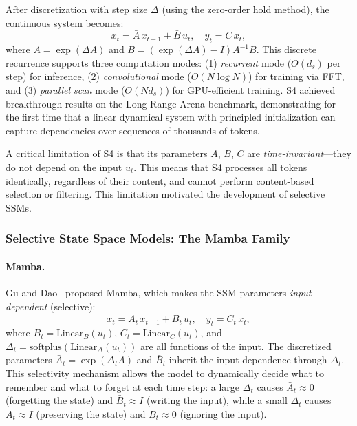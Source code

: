 After discretization with step size $\Delta$ (using the zero-order hold method), the continuous system becomes:
\begin{equation}
x_t = \bar{A}\, x_{t-1} + \bar{B}\, u_t, \quad y_t = C\, x_t,
\label{eq:ssm-discrete}
\end{equation}
where $\bar{A} = \exp(\Delta A)$ and $\bar{B} = (\exp(\Delta A) - I) A^{-1} B$. This discrete recurrence supports three computation modes: (1) \emph{recurrent} mode ($O(d_s)$ per step) for inference, (2) \emph{convolutional} mode ($O(N \log N)$) for training via FFT, and (3) \emph{parallel scan} mode ($O(N d_s)$) for GPU-efficient training. S4 achieved breakthrough results on the Long Range Arena benchmark, demonstrating for the first time that a linear dynamical system with principled initialization can capture dependencies over sequences of thousands of tokens.

A critical limitation of S4 is that its parameters $A$, $B$, $C$ are \emph{time-invariant}---they do not depend on the input $u_t$. This means that S4 processes all tokens identically, regardless of their content, and cannot perform content-based selection or filtering. This limitation motivated the development of selective SSMs.

\subsubsection{Selective State Space Models: The Mamba Family}
\label{subsubsec:mamba}

\paragraph{Mamba.}
Gu and Dao~\cite{gu2024mamba} proposed Mamba, which makes the SSM parameters \emph{input-dependent} (selective):
\begin{equation}
x_t = \bar{A}_t\, x_{t-1} + \bar{B}_t\, u_t, \quad y_t = C_t\, x_t,
\label{eq:mamba}
\end{equation}
where $B_t = \text{Linear}_B(u_t)$, $C_t = \text{Linear}_C(u_t)$, and $\Delta_t = \text{softplus}(\text{Linear}_\Delta(u_t))$ are all functions of the input. The discretized parameters $\bar{A}_t = \exp(\Delta_t A)$ and $\bar{B}_t$ inherit the input dependence through $\Delta_t$. This selectivity mechanism allows the model to dynamically decide what to remember and what to forget at each time step: a large $\Delta_t$ causes $\bar{A}_t \approx 0$ (forgetting the state) and $\bar{B}_t \approx I$ (writing the input), while a small $\Delta_t$ causes $\bar{A}_t \approx I$ (preserving the state) and $\bar{B}_t \approx 0$ (ignoring the input).


